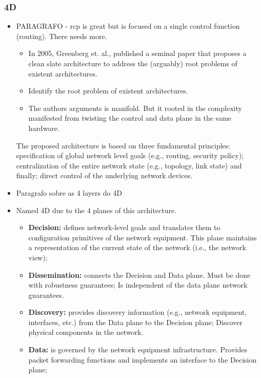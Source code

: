 \subsubsection{4D}


\begin{itemize}
\item  PARAGRAFO - \gls{rcp} is great but is focused on a single control function (routing). There needs more. 
  \begin{itemize}
     \item In 2005, Greenberg et. al., published a seminal paper that proposes a clean slate architecture to address the (arguably) root problems of existent architectures. 
     \item Identify the root problem of existent architectures. 
     \item The authors arguments is manifold. But it rooted in the complexity manifested from twisting the control and data plane in the same hardware. 
  \end{itemize}


The proposed architecture is based on three fundamental principles: specification of  global network level goals (e.g., routing, security policy);  centralization of the entire network state (e.g., topology, link state) and finally; direct control of the underlying network devices. 

\item Paragrafo sobre as 4 layers do 4D

\item Named 4D due to the 4 planes of this architecture. 

\begin{itemize}
\item[] \textbf{Decision:}  defines network-level goals and 
  translates them to configuration primitives of the network
  equipment. This plane maintains a representation of the current state of the network (i.e., the network view); 
\item[] \textbf{Dissemination:}  connects the Decision and Data plane. Must be
  done with robustness guarantees; Is independent of the data plane network guarantees. 
\item[] \textbf{Discovery:} provides discovery information (e.g., network
  equipment, interfaces, etc.) from the Data plane to the Decision plane; Discover physical components in the network. 
\item[] \textbf{Data:}  is governed by the network equipment
  infrastructure. Provides packet forwarding functions and implements
  an interface to the Decision plane;  
\end{itemize}



\end{itemize}

